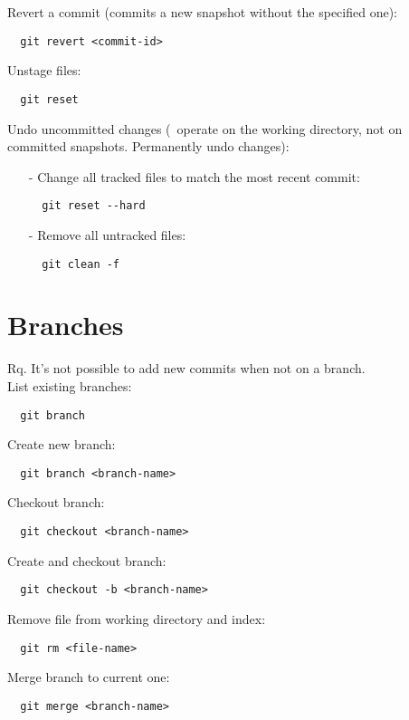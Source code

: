\documentclass[french]{article}
\begin{document}
Revert a commit (commits a new snapshot without the specified one):
\begin{verbatim}
  git revert <commit-id>
\end{verbatim}

Unstage files:
\begin{verbatim}
  git reset
\end{verbatim}

Undo uncommitted changes (\danger\ operate on the working directory, not on committed snapshots. Permanently undo changes):
\begin{itemize}
\item [-] Change all tracked files to match the most recent commit:
\begin{verbatim}
  git reset --hard
\end{verbatim}
\item [-] Remove all untracked files:
\begin{verbatim}
  git clean -f
\end{verbatim}
\end{itemize}

\section{Branches}

Rq. It's not possible to add new commits when not on a branch.\\

List existing branches:
\begin{verbatim}
  git branch
\end{verbatim}

Create new branch:
\begin{verbatim}
  git branch <branch-name>
\end{verbatim}

Checkout branch:
\begin{verbatim}
  git checkout <branch-name>
\end{verbatim}

Create and checkout branch:
\begin{verbatim}
  git checkout -b <branch-name>
\end{verbatim}

Remove file from working directory and index:
\begin{verbatim}
  git rm <file-name>
\end{verbatim}

Merge branch to current one:
\begin{verbatim}
  git merge <branch-name>
\end{verbatim}
\end{document}
